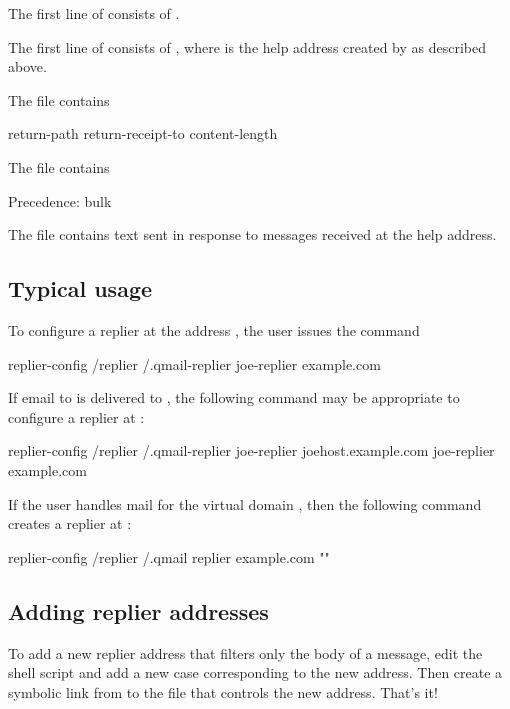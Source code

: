 \documentclass{book}
\begin{document}
The first line of  consists of .

The first line of  consists of 
, where
 is the help address created by
 as described above.

The  file contains
\begin{code}%
  return-path
  return-receipt-to
  content-length
\end{code}

The  file contains
\begin{code}%
  Precedence: bulk
\end{code}

The  file contains text sent in response to
messages received at the help address.

\subsection{Typical usage}
To configure a replier at the address , the
user  issues the command
\begin{code}%
  replier-config \swungdash /replier \swungdash /.qmail-replier joe-replier example.com
\end{code}

If email to  is delivered to
, the following command may be
appropriate to configure a replier at
:
\begin{code}%
   replier-config \swungdash /replier \swungdash /.qmail-replier joe-replier joehost.example.com joe-replier example.com
\end{code}

If the user  handles mail for the virtual domain
, then the following command creates a
replier at :
\begin{code}%
   replier-config \swungdash /replier \swungdash /.qmail replier example.com ""
\end{code}

\subsection{Adding replier addresses}
To add a new replier address that filters only the body of a message,
edit the  shell script and add a new case
corresponding to the new address.  Then create a symbolic link from
 to the  file that
controls the new address.  That's it!
\end{document}
